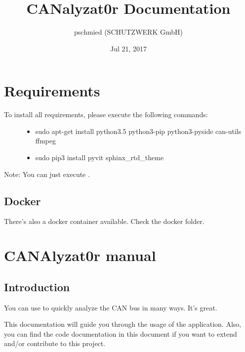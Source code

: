 \documentclass[letterpaper,10pt,english]{sphinxmanual}
\title{CANalyzat0r Documentation}
\date{Jul 21, 2017}
\author{pschmied (SCHUTZWERK GmbH)}
\begin{document}
\maketitle
\sphinxtableofcontents
{}\label{\detokenize{index::doc}}



\chapter{Requirements}
\label{\detokenize{requirements:requirements}}\label{\detokenize{requirements::doc}}\label{\detokenize{requirements:welcome-to-canalyzat0r-s-documentation}}\begin{description}
\item[{To install all requirements, please execute the following commands:}] \leavevmode\begin{itemize}
\item {} 
sudo apt-get install python3.5 python3-pip python3-pyside can-utils ffmpeg

\item {} 
sudo pip3 install pyvit sphinx\_rtd\_theme

\end{itemize}

\end{description}

Note: You can just execute .


\section{Docker}
\label{\detokenize{requirements:docker}}
There’s also a docker container available. Check the docker folder.


\chapter{CANAlyzat0r manual}
\label{\detokenize{manual:canalyzat0r-manual}}\label{\detokenize{manual::doc}}

\section{Introduction}
\label{\detokenize{manual:introduction}}
You can use  to quickly analyze the CAN bus in many ways.
It’s great.

\noindent{}

This documentation will guide you through the usage of the application.
Also, you can find the code documentation in this document if you want
to extend and/or contribute to this project.
\end{document}
